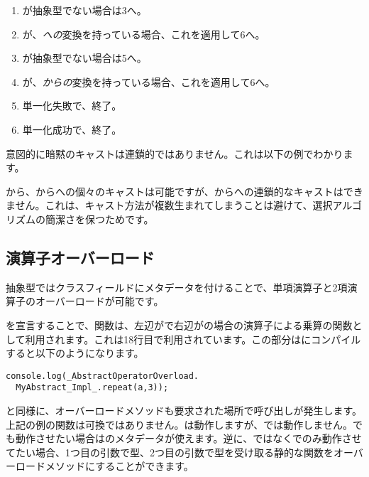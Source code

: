\begin{enumerate}
	\item {}が抽象型でない場合は3へ。
	\item {}が、\emph{への}変換を持っている場合、これを適用して6へ。
	\item {}が抽象型でない場合は5へ。
	\item {}が、\emph{からの}変換を持っている場合、これを適用して6へ。
	\item 単一化失敗で、終了。
	\item 単一化成功で、終了。
\end{enumerate}



意図的に暗黙のキャストは連鎖的ではありません。これは以下の例でわかります。


から、からへの個々のキャストは可能ですが、からへの連鎖的なキャストはできません。これは、キャスト方法が複数生まれてしまうことは避けて、選択アルゴリズムの簡潔さを保つためです。




\subsection{演算子オーバーロード}
\label{types-abstract-operator-overloading}

抽象型ではクラスフィールドにメタデータを付けることで、単項演算子と2項演算子のオーバーロードが可能です。


を宣言することで、関数は、左辺がで右辺がの場合の\expr{*}演算子による乗算の関数として利用されます。これは18行目で利用されています。この部分はにコンパイルすると以下のようになります。

\begin{lstlisting}
console.log(_AbstractOperatorOverload.
  MyAbstract_Impl_.repeat(a,3));
\end{lstlisting}


と同様に、オーバーロードメソッドも要求された場所で呼び出しが発生します。上記の例の関数は可換ではありません。は動作しますが、では動作しません。でも動作させたい場合はのメタデータが使えます。逆に、ではなくでのみ動作させてたい場合、1つ目の引数で型、2つ目の引数で型を受け取る静的な関数をオーバーロードメソッドにすることができます。

